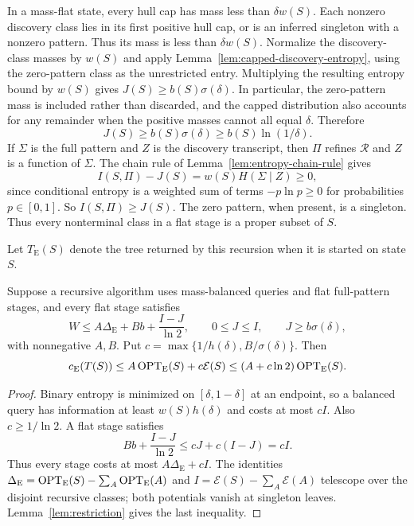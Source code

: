 In a mass-flat state, every hull cap has mass less than
$\delta w(S)$. Each nonzero discovery class lies in its first
positive hull cap, or is an inferred singleton with a nonzero
pattern. Thus its mass is less than $\delta w(S)$.
Normalize the discovery-class masses by $w(S)$ and apply
Lemma~\ref{lem:capped-discovery-entropy},
using the zero-pattern class as the unrestricted entry. Multiplying
the resulting entropy bound by $w(S)$ gives
$J(S)\ge b(S)\sigma(\delta)$.
In particular, the zero-pattern mass is included rather than
discarded, and the capped distribution also accounts for any
remainder when the positive masses cannot all equal $\delta$.
Therefore
\begin{equation}\label{eq:pattern-entropy-slack}
 J(S)\ge b(S)\sigma(\delta)\ge b(S)\ln(1/\delta).
\end{equation}
If $\Sigma$ is the full pattern and $Z$ is the discovery transcript,
then $\Pi$ refines $\mathcal R$ and $Z$ is a function of $\Sigma$.
The chain rule of Lemma~\ref{lem:entropy-chain-rule} gives
\[
 I(S,\Pi)-J(S)=w(S)H(\Sigma\mid Z)\ge0,
\]
since conditional entropy is a weighted sum of terms
$-p\ln p\ge0$ for probabilities $p\in[0,1]$.
So $I(S,\Pi)\ge J(S)$.
The zero pattern, when present, is a singleton. Thus every
nonterminal class in a flat stage is a proper subset of $S$.

Let $T_{\mathrm E}(S)$ denote the tree returned by this recursion
when it is started on state $S$.

\begin{lemma}\label{lem:stage-conversion}
Suppose a recursive algorithm uses mass-balanced queries and flat
full-pattern stages, and every flat stage satisfies
\[
 W\le A\Delta_{\mathrm E}+Bb+\frac{I-J}{\ln2},\qquad
 0\le J\le I,\qquad J\ge b\sigma(\delta),
\]
with nonnegative $A,B$. Put
$c=\max\{1/h(\delta),B/\sigma(\delta)\}$. Then
\[
 c_{\mathrm E}(T(S))\le A\operatorname{OPT}_{\mathrm E}(S)+c\mathcal E(S)
 \le(A+c\ln2)\operatorname{OPT}_{\mathrm E}(S).
\]
\end{lemma}
\begin{proof}
Binary entropy is minimized on $[\delta,1-\delta]$ at an endpoint,
so a balanced query has information at least $w(S)h(\delta)$ and
costs at most $cI$. Also $c\ge1/\ln2$. A flat stage satisfies
\[
 Bb+\frac{I-J}{\ln2}\le cJ+c(I-J)=cI.
\]
Thus every stage costs at most $A\Delta_{\mathrm E}+cI$. The identities
$\Delta_{\mathrm E}=\operatorname{OPT}_{\mathrm E}(S)-\sum_A\operatorname{OPT}_{\mathrm E}(A)$
and $I=\mathcal E(S)-\sum_A\mathcal E(A)$ telescope over the disjoint
recursive classes; both potentials vanish at singleton leaves.
Lemma~\ref{lem:restriction} gives the last inequality.
\end{proof}

